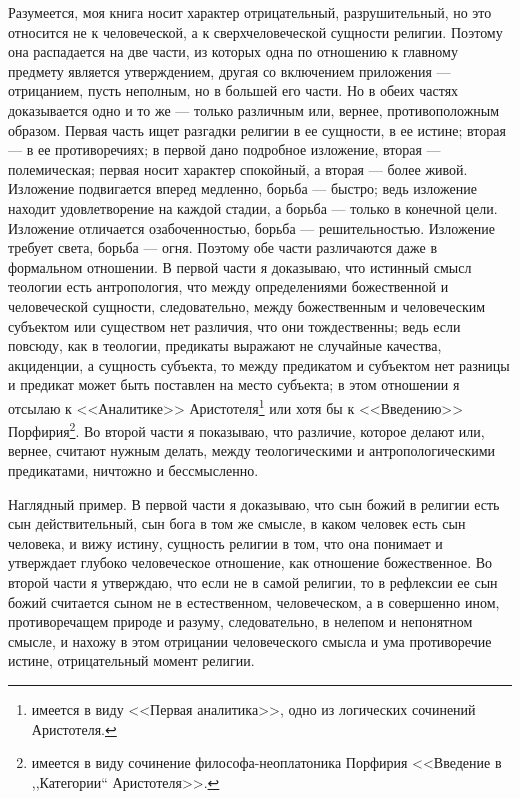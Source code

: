 \documentclass[12pt,oneside]{book}
\begin{document}
Разумеется, моя книга носит характер отрицательный, разрушительный, но это относится не к человеческой, а к сверхчеловеческой сущности религии. Поэтому она распадается на две части, из которых одна по отношению к главному предмету является утверждением, другая со включением приложения --- отрицанием, пусть неполным, но в большей его части. Но в обеих частях доказывается одно и то же --- только различным или, вернее, противоположным образом. Первая часть ищет разгадки религии в ее сущности, в ее истине; вторая --- в ее противоречиях; в первой дано подробное изложение, вторая --- полемическая; первая носит характер спокойный, а вторая --- более живой. Изложение подвигается вперед медленно, борьба --– быстро; ведь изложение находит удовлетворение на каждой стадии, а борьба --- только в конечной цели. Изложение отличается озабоченностью, борьба --- решительностью. Изложение требует света, борьба --- огня. Поэтому обе части различаются даже в формальном отношении. В первой части я доказываю, что истинный смысл теологии есть антропология, что между определениями божественной и человеческой сущности, следовательно, между божественным и человеческим субъектом или существом нет различия, что они тождественны; ведь если повсюду, как в теологии, предикаты выражают не случайные качества, акциденции, а сущность субъекта, то между предикатом и субъектом нет разницы и предикат может быть поставлен на место субъекта; в этом отношении я отсылаю к <<Аналитике>> Аристотеля\footnote{имеется в виду <<Первая аналитика>>, одно из логических сочинений Аристотеля.} или хотя бы к <<Введению>> Порфирия\footnote{имеется в виду сочинение философа-неоплатоника Порфирия <<Введение в ,,Категории`` Аристотеля>>.}. Во второй части я показываю, что различие, которое делают или, вернее, считают нужным делать, между теологическими и антропологическими предикатами, ничтожно и бессмысленно.

Наглядный пример. В первой части я доказываю, что сын божий в религии есть сын действительный, сын бога в том же смысле, в каком человек есть сын человека, и вижу истину, сущность религии в том, что она понимает и утверждает глубоко человеческое отношение, как отношение божественное. Во второй части я утверждаю, что если не в самой религии, то в рефлексии ее сын божий считается сыном не в естественном, человеческом, а в совершенно ином, противоречащем природе и разуму, следовательно, в нелепом и непонятном смысле, и нахожу в этом отрицании человеческого смысла и ума противоречие истине, отрицательный момент религии.
\end{document}
